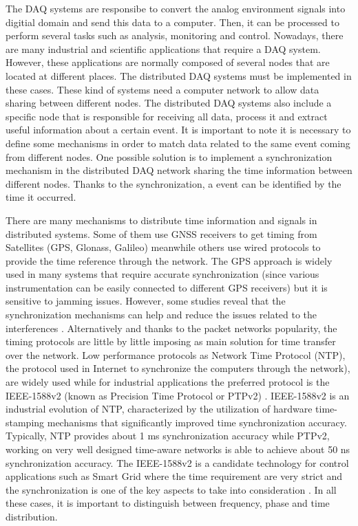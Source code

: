 The DAQ systems are responsibe to convert the analog environment signals into digitial domain and send this data to a computer. Then, it can be processed to perform several tasks such as analysis, monitoring and control. Nowadays, there are many industrial and scientific applications that require a DAQ system. However, these applications are normally composed of several nodes that are located at different places. The distributed DAQ systems must be implemented in these cases. These kind of systems need a computer network to allow data sharing between different nodes. The distributed DAQ systems also include a specific node that is responsible for receiving all data, process it and extract useful information about a certain event. It is important to note it is necessary to define some mechanisms in order to match data related to the same event coming from different nodes. One possible solution is to implement a synchronization mechanism in the distributed DAQ network sharing the time information between different nodes. Thanks to the synchronization, a event can be identified by the time it occurred.


There are many mechanisms to distribute time information and signals in distributed systems. Some of them use GNSS receivers to get timing from Satellites (GPS, Glonass, 
Galileo) meanwhile others use wired protocols to provide the time reference 
through the network. The GPS approach is widely used in many systems that require accurate synchronization (since various instrumentation can be easily connected to different GPS receivers) but it is sensitive to jamming issues. However, some studies reveal that the synchronization mechanisms can help and reduce the issues related to the interferences \cite{NOURA2016130}. Alternatively and thanks to the packet networks popularity, the timing protocols are little by little imposing as main solution for time transfer over the network. Low performance protocols as Network Time Protocol (NTP), the protocol used in Internet to synchronize the computers through the network), \cite{ntf:ntp_std} are widely used while for industrial applications the preferred protocol is the IEEE-1588v2 (known as Precision Time Protocol or PTPv2) \cite{ieee:ieee1588_std} \cite{itu:TG8275_1_Y_1369_1}. IEEE-1588v2 is an industrial evolution of NTP, characterized by the utilization of hardware time-stamping mechanisms that significantly improved time synchronization accuracy. Typically, NTP provides about 1 ms synchronization accuracy while PTPv2, working on very well designed time-aware networks is able to achieve about 50 ns synchronization accuracy. The IEEE-1588v2 is a candidate technology for control applications such as Smart Grid \cite{NAFI201623} where the time requirement are very strict and the synchronization is one of the key aspects to take into consideration \cite{COLAK2016396}.
In all these cases, it is important to distinguish between frequency, phase and time distribution.

